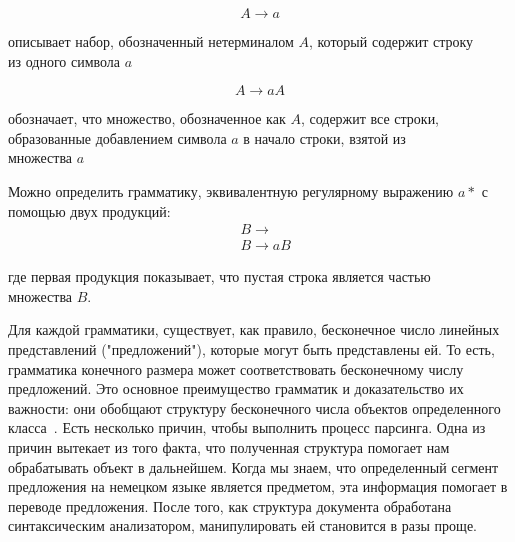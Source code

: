 \begin{equation}
  A \rightarrow a
\end{equation}
\begin{explanation}
описывает набор, обозначенный нетерминалом $A$, который содержит строку \\
из одного символа $a$
\end{explanation}

\begin{equation}
  A \rightarrow aA
\end{equation}
\begin{explanation}
обозначает, что множество, обозначенное как $A$, содержит все строки,\\
образованные добавлением символа $a$ в начало строки, взятой из \\ множества $a$
\end{explanation}
Можно определить  грамматику, эквивалентную регулярному выражению $a*$ с помощью двух продукций:
\begin{equation}
\begin{aligned}
  &B \rightarrow        \\
  &B \rightarrow aB
\end{aligned}
\end{equation}
\begin{explanation}
где первая продукция показывает, что пустая строка является частью \\
множества $B$.
\end{explanation}

Для каждой грамматики, существует, как правило, бесконечное число линейных представлений
("предложений"), которые могут быть представлены ей. То есть, грамматика конечного размера может соответствовать бесконечному числу предложений. Это основное преимущество грамматик
и доказательство их важности: они обобщают структуру бесконечного числа объектов определенного класса~\cite{cfg_evidence}.
Есть несколько причин, чтобы выполнить процесс парсинга. Одна из
причин вытекает из того факта, что полученная структура помогает нам обрабатывать объект
в дальнейшем. Когда мы знаем, что определенный сегмент предложения на немецком языке является предметом,
эта информация помогает в переводе предложения. После того, как структура документа обработана синтаксическим анализатором, манипулировать ей становится в разы проще.
